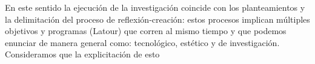 En este sentido la ejecución de la investigación coincide con los planteamientos y la delimitación del proceso de reflexión-creación: estos procesos implican múltiples objetivos y programas (Latour) que corren al mismo tiempo y que podemos enunciar de manera general como: tecnológico, estético y de investigación. Consideramos que la explicitación de esto 
